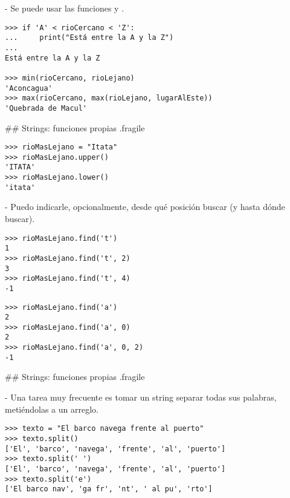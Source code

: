 
- Se puede usar las funciones  y .

\begin{lstlisting}[style=frame03]
>>> if 'A' < rioCercano < 'Z':
...     print("Está entre la A y la Z")
... 
Está entre la A y la Z

>>> min(rioCercano, rioLejano)
'Aconcagua'
>>> max(rioCercano, max(rioLejano, lugarAlEste))
'Quebrada de Macul'
\end{lstlisting}

## Strings: funciones propias {.fragile}


\begin{lstlisting}[style=frame03]
>>> rioMasLejano = "Itata"
>>> rioMasLejano.upper()
'ITATA'
>>> rioMasLejano.lower()
'itata'
\end{lstlisting}


- Puedo indicarle, opcionalmente, desde qué posición buscar (y hasta dónde buscar).

\bgncolumns[-1ex]

\begin{lstlisting}[style=frame03]
>>> rioMasLejano.find('t')
1
>>> rioMasLejano.find('t', 2)
3
>>> rioMasLejano.find('t', 4)
-1
\end{lstlisting}


\begin{lstlisting}[style=frame03]
>>> rioMasLejano.find('a')
2
>>> rioMasLejano.find('a', 0)
2
>>> rioMasLejano.find('a', 0, 2)
-1
\end{lstlisting}

\trmcolumns


## Strings: funciones propias {.fragile}


- Una tarea muy frecuente es tomar un string separar todas sus palabras, metiéndolas a un arreglo.

\begin{lstlisting}[style=frame03]
>>> texto = "El barco navega frente al puerto"
>>> texto.split()
['El', 'barco', 'navega', 'frente', 'al', 'puerto']
>>> texto.split(' ')
['El', 'barco', 'navega', 'frente', 'al', 'puerto']
>>> texto.split('e')
['El barco nav', 'ga fr', 'nt', ' al pu', 'rto']
\end{lstlisting}

